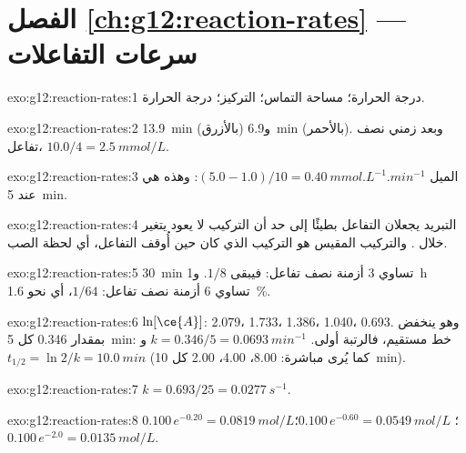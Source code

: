 \section*{الفصل \ref{ch:g12:reaction-rates} --- سرعات التفاعلات}

\begin{solution}{exo:g12:reaction-rates:1}
درجة الحرارة؛ مساحة التماس؛ التركيز؛ درجة الحرارة.
\end{solution}

\begin{solution}{exo:g12:reaction-rates:2}
\qty{13.9}{min} (بالأزرق) و\qty{6.9}{min} (بالأحمر). وبعد زمني نصف تفاعل،
$10.0 / 4 = \qty{2.5}{mmol/L}$.
\end{solution}

\begin{solution}{exo:g12:reaction-rates:3}
الميل $(5.0 - 1.0)/10 = \qty{0.40}{mmol.L^{-1}.min^{-1}}$: وهذه هي
 عند \qty{5}{min}.
\end{solution}

\begin{solution}{exo:g12:reaction-rates:4}
التبريد  يجعلان التفاعل بطيئًا إلى حد أن التركيب لا
يعود يتغير خلال . والتركيب المقيس هو التركيب الذي
كان  حين أُوقف التفاعل، أي لحظة الصب.
\end{solution}

\begin{solution}{exo:g12:reaction-rates:5}
\qty{30}{min} تساوي 3 أزمنة نصف تفاعل: فيبقى $1/8$. و\qty{1}{h} تساوي 6 أزمنة نصف تفاعل:
$1/64$، أي نحو \qty{1.6}{\percent}.
\end{solution}

\begin{solution}{exo:g12:reaction-rates:6}
$\ln[\ce{A}]$: 2.079، 1.733، 1.386، 1.040، 0.693. وهو ينخفض بمقدار 0.346 كل
\qty{5}{min}: خط مستقيم، فالرتبة أولى. $k = 0.346/5 =
\qty{0.0693}{min^{-1}}$ و$t_{1/2} = \ln 2 / k = \qty{10.0}{min}$ (كما
يُرى مباشرة: 8.00، 4.00، 2.00 كل \qty{10}{min}).
\end{solution}

\begin{solution}{exo:g12:reaction-rates:7}
$k = 0.693 / 25 = \qty{0.0277}{s^{-1}}$.
\end{solution}

\begin{solution}{exo:g12:reaction-rates:8}
$0.100\,e^{-0.20} = \qty{0.0819}{mol/L}$؛ $0.100\,e^{-0.60} =
\qty{0.0549}{mol/L}$؛ $0.100\,e^{-2.0} = \qty{0.0135}{mol/L}$.
\end{solution}

